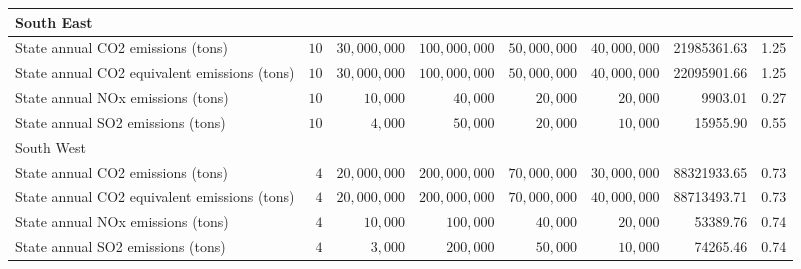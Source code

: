 \documentclass[
]{article}
\begin{document}
\begin{longtable}{lrrrrrrr}
\midrule
\multicolumn{8}{l}{South East} \\ 
\midrule
State annual CO2 emissions (tons) & $10$ & $30,000,000$ & $100,000,000$ & $50,000,000$ & $40,000,000$ & 21985361.63 & 1.25 \\ 
State annual CO2 equivalent emissions (tons) & $10$ & $30,000,000$ & $100,000,000$ & $50,000,000$ & $40,000,000$ & 22095901.66 & 1.25 \\ 
State annual NOx emissions (tons) & $10$ & $10,000$ & $40,000$ & $20,000$ & $20,000$ & 9903.01 & 0.27 \\ 
State annual SO2 emissions (tons) & $10$ & $4,000$ & $50,000$ & $20,000$ & $10,000$ & 15955.90 & 0.55 \\ 
\midrule
\multicolumn{8}{l}{South West} \\ 
\midrule
State annual CO2 emissions (tons) & $4$ & $20,000,000$ & $200,000,000$ & $70,000,000$ & $30,000,000$ & 88321933.65 & 0.73 \\ 
State annual CO2 equivalent emissions (tons) & $4$ & $20,000,000$ & $200,000,000$ & $70,000,000$ & $40,000,000$ & 88713493.71 & 0.73 \\ 
State annual NOx emissions (tons) & $4$ & $10,000$ & $100,000$ & $40,000$ & $20,000$ & 53389.76 & 0.74 \\ 
State annual SO2 emissions (tons) & $4$ & $3,000$ & $200,000$ & $50,000$ & $10,000$ & 74265.46 & 0.74 \\ 
\bottomrule
\end{longtable}
\end{document}

